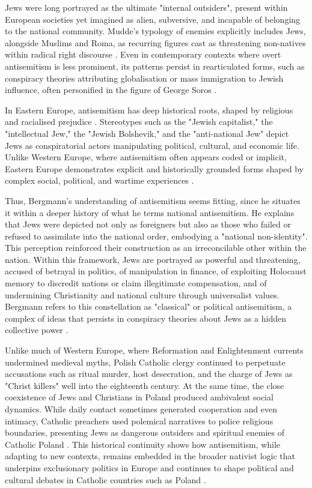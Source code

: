 Jews were long portrayed as the ultimate "internal outsiders", present within European societies yet imagined as alien, subversive, and incapable of belonging to the national community. Mudde's typology of enemies explicitly includes Jews, alongside Muslims and Roma, as recurring figures cast as threatening non-natives within radical right discourse \citep{mudde_populist_2007}. Even in contemporary contexts where overt antisemitism is less prominent, its patterns persist in rearticulated forms, such as conspiracy theories attributing globalisation or mass immigration to Jewish influence, often personified in the figure of George Soros \citep{demata_anti-sorosism_2022}.

In Eastern Europe, antisemitism has deep historical roots, shaped by religious and racialised prejudice \citep{demata_anti-sorosism_2022}. Stereotypes such as the "Jewish capitalist," the "intellectual Jew," the "Jewish Bolshevik," and the "anti-national Jew" depict Jews as conspiratorial actors manipulating political, cultural, and economic life. Unlike Western Europe, where antisemitism often appears coded or implicit, Eastern Europe demonstrates explicit and historically grounded forms shaped by complex social, political, and wartime experiences \citep{wodak__2017}.

Thus, Bergmann's understanding of antisemitism seems fitting, since he situates it within a deeper history of what he terms national antisemitism. He explains that Jews were depicted not only as foreigners but also as those who failed or refused to assimilate into the national order, embodying a "national non-identity". This perception reinforced their construction as an irreconcilable other within the nation. Within this framework, Jews are portrayed as powerful and threatening, accused of betrayal in politics, of manipulation in finance, of exploiting Holocaust memory to discredit nations or claim illegitimate compensation, and of undermining Christianity and national culture through universalist values. Bergmann refers to this constellation as "classical" or political antisemitism, a complex of ideas that persists in conspiracy theories about Jews as a hidden collective power \citep{bergmann_antisemitism_2013}.

Unlike much of Western Europe, where Reformation and Enlightenment currents undermined medieval myths, Polish Catholic clergy continued to perpetuate accusations such as ritual murder, host desecration, and the charge of Jews as "Christ killers" well into the eighteenth century. At the same time, the close coexistence of Jews and Christians in Poland produced ambivalent social dynamics. While daily contact sometimes generated cooperation and even intimacy, Catholic preachers used polemical narratives to police religious boundaries, presenting Jews as dangerous outsiders and spiritual enemies of Catholic Poland \citep{teter_jews_2005}. This historical continuity shows how antisemitism, while adapting to new contexts, remains embedded in the broader nativist logic that underpins exclusionary politics in Europe and continues to shape political and cultural debates in Catholic countries such as Poland \citep{bergmann_antisemitism_2013}.

